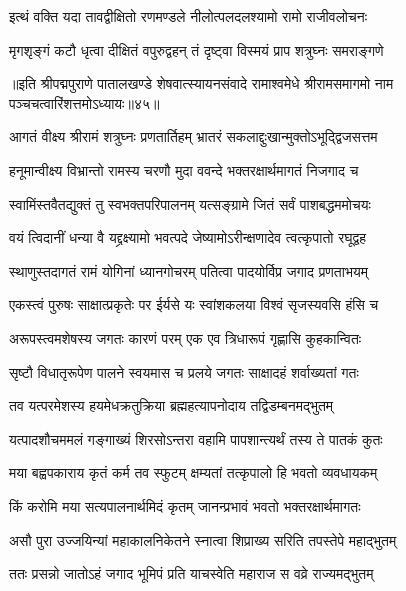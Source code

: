 \twolineshloka
{इत्थं वक्ति यदा तावद्वीक्षितो रणमण्डले}
{नीलोत्पलदलश्यामो रामो राजीवलोचनः}%

\twolineshloka
{मृगशृङ्गं कटौ धृत्वा दीक्षितं वपुरुद्वहन्}
{तं दृष्ट्वा विस्मयं प्राप शत्रुघ्नः समराङ्गणे}%

॥इति श्रीपद्मपुराणे पातालखण्डे शेषवात्स्यायनसंवादे रामाश्वमेधे श्रीरामसमागमो नाम पञ्चचत्वारिंशत्तमोऽध्यायः॥४५॥



\twolineshloka
{आगतं वीक्ष्य श्रीरामं शत्रुघ्नः प्रणतार्तिहम्}
{भ्रातरं सकलाद्दुःखान्मुक्तोऽभूद्द्विजसत्तम}%

\twolineshloka
{हनूमान्वीक्ष्य विभ्रान्तो रामस्य चरणौ मुदा}
{ववन्दे भक्तरक्षार्थमागतं निजगाद च}%

\twolineshloka
{स्वामिंस्तवैतद्युक्तं तु स्वभक्तपरिपालनम्}
{यत्सङ्ग्रामे जितं सर्वं पाशबद्धममोचयः}%

\twolineshloka
{वयं त्विदानीं धन्या वै यद्द्रक्ष्यामो भवत्पदे}
{जेष्यामोऽरीन्क्षणादेव त्वत्कृपातो रघूद्वह}%


\twolineshloka
{स्थाणुस्तदागतं रामं योगिनां ध्यानगोचरम्}
{पतित्वा पादयोर्विप्र जगाद प्रणताभयम्}%

\twolineshloka
{एकस्त्वं पुरुषः साक्षात्प्रकृतेः पर ईर्यसे}
{यः स्वांशकलया विश्वं सृजस्यवसि हंसि च}%

\twolineshloka
{अरूपस्त्वमशेषस्य जगतः कारणं परम्}
{एक एव त्रिधारूपं गृह्णासि कुहकान्वितः}%

\twolineshloka
{सृष्टौ विधातृरूपेण पालने स्वयमास च}
{प्रलये जगतः साक्षादहं शर्वाख्यतां गतः}%

\twolineshloka
{तव यत्परमेशस्य हयमेधक्रतुक्रिया}
{ब्रह्महत्यापनोदाय तद्विडम्बनमद्भुतम्}%

\twolineshloka
{यत्पादशौचममलं गङ्गाख्यं शिरसोऽन्तरा}
{वहामि पापशान्त्यर्थं तस्य ते पातकं कुतः}%

\twolineshloka
{मया बह्वपकाराय कृतं कर्म तव स्फुटम्}
{क्षम्यतां तत्कृपालो हि भवतो व्यवधायकम्}%

\twolineshloka
{किं करोमि मया सत्यपालनार्थमिदं कृतम्}
{जानन्प्रभावं भवतो भक्तरक्षार्थमागतः}%

\twolineshloka
{असौ पुरा उज्जयिन्यां महाकालनिकेतने}
{स्नात्वा शिप्राख्य सरिति तपस्तेपे महाद्भुतम्}%

\twolineshloka
{ततः प्रसन्नो जातोऽहं जगाद भूमिपं प्रति}
{याचस्वेति महाराज स वव्रे राज्यमद्भुतम्}%

